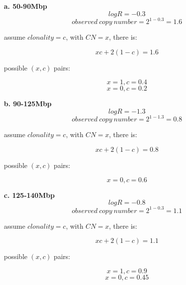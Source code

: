 \documentclass[a4paper]{article}
\begin{document}
\textbf{a. 50-90Mbp}
\begin{equation*}
logR = -0.3 
\end{equation*}
\begin{equation*}
observed\ copy\ number = 2^{1-0.3}=1.6
\end{equation*}

assume $clonality = c$, with $CN = x$, there is:

\begin{equation*}
xc+2(1-c) = 1.6
\end{equation*}

possible $(x,c)$ pairs:

\begin{equation*}
x = 1, c = 0.4
\end{equation*}
\begin{equation*}
x = 0, c = 0.2
\end{equation*}

\textbf{b. 90-125Mbp}
\begin{equation*}
logR = -1.3 
\end{equation*}
\begin{equation*}
observed\ copy\ number = 2^{1-1.3}=0.8
\end{equation*}

assume $clonality = c$, with $CN = x$, there is:

\begin{equation*}
xc+2(1-c) = 0.8
\end{equation*}

possible $(x,c)$ pairs:

\begin{equation*}
x = 0, c = 0.6
\end{equation*}

\textbf{c. 125-140Mbp}
\begin{equation*}
logR = -0.8
\end{equation*}
\begin{equation*}
observed\ copy\ number = 2^{1-0.3}=1.1
\end{equation*}

assume $clonality = c$, with $CN = x$, there is:

\begin{equation*}
xc+2(1-c) = 1.1
\end{equation*}

possible $(x,c)$ pairs:

\begin{equation*}
x = 1, c = 0.9
\end{equation*}
\begin{equation*}
x = 0, c = 0.45
\end{equation*}
\end{document}
